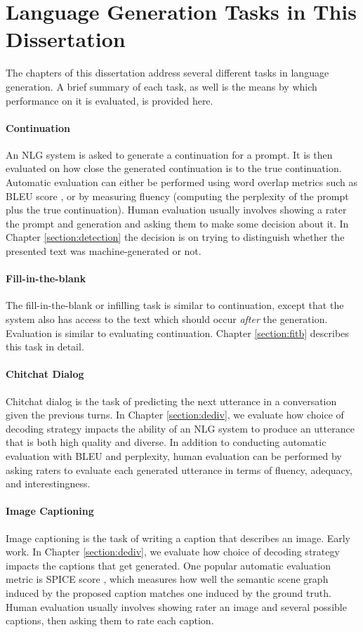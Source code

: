 \section{Language Generation Tasks in This Dissertation}
The chapters of this dissertation address several different tasks in language generation.
A brief summary of each task, as well is the means by which performance on it is evaluated, is provided here.

\paragraph{Continuation}
An NLG system is asked to generate a continuation for a prompt. It is then evaluated on how close the generated continuation is to the true continuation. Automatic evaluation can either be performed using word overlap metrics such as BLEU score \citep{papineni2001bleu}, or by measuring fluency (computing the perplexity of the prompt plus the true continuation). Human evaluation usually involves showing a rater the prompt and generation and asking them to make some decision about it. In Chapter \ref{section:detection} the decision is on trying to distinguish whether the presented text was machine-generated or not.

\paragraph{Fill-in-the-blank}
The fill-in-the-blank or infilling task is similar to continuation, except that the system also has access to the text which should occur \textit{after} the generation.
Evaluation is similar to evaluating continuation.
Chapter \ref{section:fitb} describes this task in detail.

\paragraph{Chitchat Dialog}
Chitchat dialog is the task of predicting the next utterance in a conversation given the previous turns.
In Chapter \ref{section:dediv}, we evaluate how choice of decoding strategy impacts the ability of an NLG system to produce an utterance that is both high quality and diverse.
In addition to conducting automatic evaluation with BLEU and perplexity, human evaluation can be performed by asking raters to evaluate each generated utterance in terms of fluency, adequacy, and interestingness.

\paragraph{Image Captioning}
Image captioning is the task of writing a caption that describes an image.
Early work.
In Chapter \ref{section:dediv}, we evaluate how choice of decoding strategy impacts the captions that get generated.
One popular automatic evaluation metric is SPICE score \citep{Anderson2016SPICE}, which measures how well the semantic scene graph induced by the proposed caption matches one induced by the ground truth.
Human evaluation usually involves showing rater an image and several possible captions, then asking them to rate each caption.

